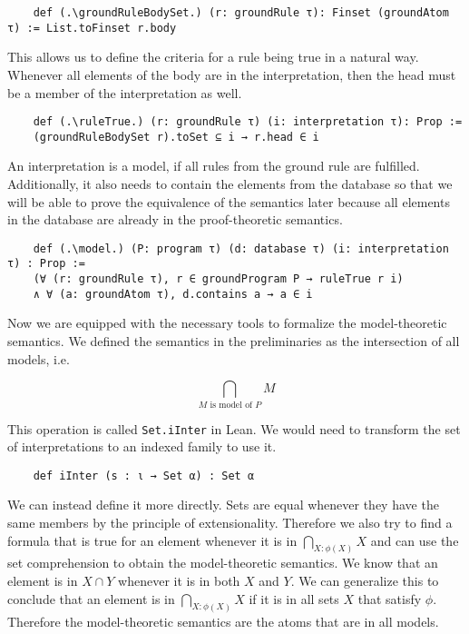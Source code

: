 \begin{lstlisting}
    def (.\groundRuleBodySet.) (r: groundRule τ): Finset (groundAtom τ) := List.toFinset r.body
\end{lstlisting}

This allows us to define the criteria for a rule being true in a natural way. Whenever all elements of the body are in the interpretation, then the head must be a member of the interpretation as well.

\begin{lstlisting}
    def (.\ruleTrue.) (r: groundRule τ) (i: interpretation τ): Prop := 
    (groundRuleBodySet r).toSet ⊆ i → r.head ∈ i
\end{lstlisting}

An interpretation is a model, if all rules from the ground rule are fulfilled. Additionally, it also needs to contain the elements from the database so that we will be able to prove the equivalence of the semantics later because all elements in the database are already in the proof-theoretic semantics.

\begin{lstlisting}
    def (.\model.) (P: program τ) (d: database τ) (i: interpretation τ) : Prop := 
    (∀ (r: groundRule τ), r ∈ groundProgram P → ruleTrue r i) 
    ∧ ∀ (a: groundAtom τ), d.contains a → a ∈ i
\end{lstlisting}

Now we are equipped with the necessary tools to formalize the model-theoretic semantics.  We defined the semantics in the preliminaries as the intersection of all models, i.e.

\[\bigcap_{\text{$M$ is model of $P$}} M\] 

This operation is called \lstinline|Set.iInter| in Lean. We would need to transform the set of interpretations to an indexed family to use it.

\begin{lstlisting}
    def iInter (s : ι → Set α) : Set α
\end{lstlisting}

We can instead define it more directly. Sets are equal whenever they have the same members by the principle of extensionality. Therefore we also try to find a formula that is true for an element whenever it is in $\bigcap_{X: \phi(X) } X $ and can use the set comprehension to obtain the model-theoretic semantics. We know that an element is in $X \cap Y$ whenever it is in both $X$ and $Y$. We can generalize this to conclude that an element is in $\bigcap_{X: \phi(X) } X $ if it is in all sets $X$ that satisfy $\phi$. Therefore the model-theoretic semantics are the atoms that are in all models.

